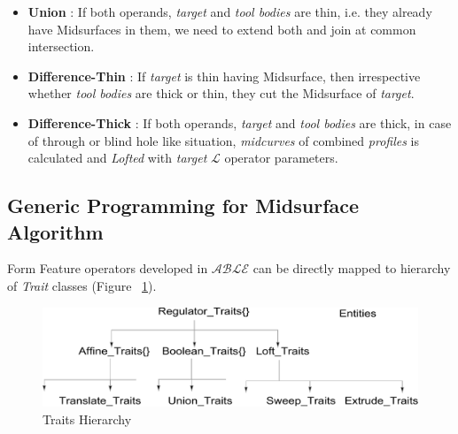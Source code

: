 \begin{itemize}[noitemsep,topsep=2pt,parsep=2pt,partopsep=2pt,label={},leftmargin=*]

\item {\bf Union} : If both operands, {\em target} and {\em tool bodies} are thin, i.e. they already have Midsurfaces in them, we need to extend both and join at common intersection.

\item {\bf Difference-Thin} : If {\em target} is thin having Midsurface, then irrespective whether {\em tool bodies} are thick or thin, they cut the Midsurface of {\em target}.


\item {\bf Difference-Thick} : If both operands, {\em target} and {\em tool bodies} are thick, in case of through or blind hole like situation, {\em midcurves} of combined {\em profiles} is calculated and {\em Lofted} with {\em target} {\bf $\mathcal{L}$} operator parameters.

\end{itemize}

\subsection{Generic Programming for Midsurface Algorithm}
Form Feature operators developed in $\mathcal{ABLE}$ can be directly mapped to hierarchy of {\em Trait} classes (Figure ~\ref{figure_Traits}).

\begin{figure}[h]
\begin{center}
\includegraphics[scale=0.45]{../Common/images//Traits_hierarchy.pdf}
\end{center}
\caption{Traits Hierarchy}
\label{figure_Traits}
\end{figure}

